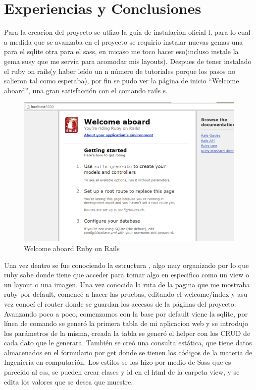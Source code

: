 \section{Experiencias y Conclusiones}
Para la creacion del proyecto se utlizo la guia de instalacion oficial l, para lo cual a medida que se avanzaba en el proyecto se requirio instalar nuevas gemas una para el sqlite otra para el sass, en micaso me toco hacer eso(incluso instale la gema susy que me servia para acomodar mis layouts). Despues de tener instalado el ruby on rails(y haber leído un n número de tutoriales porque los pasos no salieron tal como esperaba), por fin se pudo ver la página de inicio “Welcome aboard”, una gran satisfacción con el comando rails s.

\begin{figure}
\centering
\includegraphics[scale=0.8]{imagenes/rails0.png}
\caption{Welcome aboard Ruby on Rails}
\label{fig: threadsVsSync}
\end{figure}

 Una vez dentro se fue conociendo la estructura , algo muy organizado por lo que ruby sabe donde tiene que acceder para tomar algo en especifico como un  view o un layout o una imagen. Una vez conocida la ruta de la pagina que me mostraba ruby por default, comencé a hacer las pruebas, editando el welcome/index y asu vez conocí el router donde se guardan los accesos de la páginas del proyecto. Avanzando poco a poco, comenzamos con la base por default viene la sqlite, por línea de comando se generó la primera tabla de mi aplicacion web y se introdujo los parámetros de la misma, creada la tabla se generó el helper con los CRUD de cada dato que le generara. También se creó una consulta estática, que tiene datos almacenados en el formulario por get donde se tienen los códigos de la materia de Ingeniería en computación.
Los estilos se los hizo por medio de Sass que es parecido al css, se pueden crear clases y id en el html de la carpeta view, y se edita los valores que se desea que muestre.

